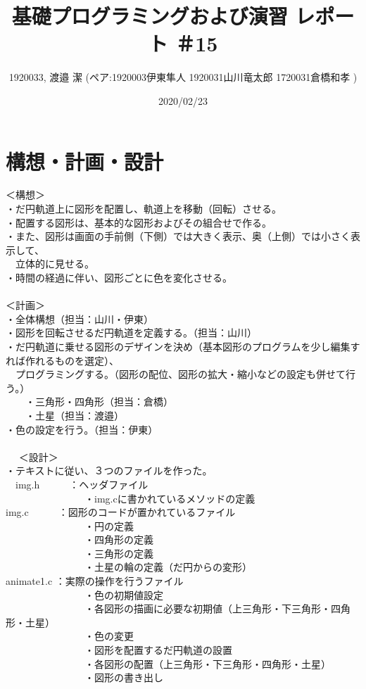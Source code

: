 \documentclass[12pt,a4j]{jarticle}
\begin{document}
\title{基礎プログラミングおよび演習 レポート ＃15}
\author{1920033, 渡邉 潔 (ペア:1920003伊東隼人 1920031山川竜太郎 1720031倉橋和孝 )}
\date{2020/02/23}
\maketitle

\section{構想・計画・設計}
＜構想＞\\
・だ円軌道上に図形を配置し、軌道上を移動（回転）させる。\\
・配置する図形は、基本的な図形およびその組合せで作る。\\
・また、図形は画面の手前側（下側）では大きく表示、奥（上側）では小さく表示して、\\
　立体的に見せる。\\
・時間の経過に伴い、図形ごとに色を変化させる。\\
\\
＜計画＞\\
・全体構想（担当：山川・伊東）\\
・図形を回転させるだ円軌道を定義する。（担当：山川）\\
・だ円軌道に乗せる図形のデザインを決め（基本図形のプログラムを少し編集すれば作れるものを選定）、\\
　プログラミングする。（図形の配位、図形の拡大・縮小などの設定も併せて行う。）\\
　　・三角形・四角形（担当：倉橋）\\
　　・土星（担当：渡邉）\\
・色の設定を行う。（担当：伊東）\\
\\　
＜設計＞\\
・テキストに従い、３つのファイルを作った。\\
　img.h　　　：ヘッダファイル\\
　　　　　　　　・img.cに書かれているメソッドの定義\\
  img.c　　　：図形のコードが置かれているファイル\\
　　　　　　　　・円の定義\\
　　　　　　　　・四角形の定義\\
　　　　　　　　・三角形の定義\\
　　　　　　　　・土星の輪の定義（だ円からの変形）\\
  animate1.c ：実際の操作を行うファイル\\
　　　　　　　　・色の初期値設定\\
　　　　　　　　・各図形の描画に必要な初期値（上三角形・下三角形・四角形・土星）\\
　　　　　　　　・色の変更\\
　　　　　　　　・図形を配置するだ円軌道の設置\\
　　　　　　　　・各図形の配置（上三角形・下三角形・四角形・土星）\\
　　　　　　　　・図形の書き出し\\
\end{document}
